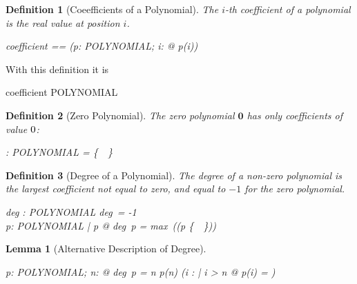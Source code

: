 \documentclass[12pt]{scrartcl}
\newtheorem{lemma}{Lemma}[section]
\newtheorem{zdef}{Definition}[section]
\begin{document}
\begin{zdef}[Coeefficients of a Polynomial]
  \label{zdef:coefficient}
  The $i$-th coefficient of a polynomial is the real value at position
  $i$. 
  \begin{zed}
    coefficient == (\lambda p: POLYNOMIAL; i: \nat @ p(i))
  \end{zed}
\end{zdef}
%
With this definition it is
\begin{zed}
  coefficient \in POLYNOMIAL \cross \nat \fun \arithmos
\end{zed}
%
\newcommand{\zeropol}{\mathbf{0}}
\begin{zdef}[Zero Polynomial]
  \label{zdef:zero-polynomial}
  The \emph{zero polynomial} $\zeropol$ has only coefficients of value
  $0$:
  \begin{axdef}
    \zeropol : POLYNOMIAL
    \where
    \ran \zeropol = \{~\azero~\}
  \end{axdef}
\end{zdef}

\begin{zdef}[Degree of a Polynomial]
  The degree of a non-zero polynomial is the largest coefficient not equal to
  zero, and equal to $-1$ for the zero polynomial.
  \label{zdef:degree}
  \begin{axdef}
    deg : POLYNOMIAL \fun \nat
    \where
    deg~\zeropol = -1 \\
    \forall p: POLYNOMIAL | p \neq \zeropol @ deg~p = max~(\dom (p \nrres
  \{~\azero~\}))\\
  \end{axdef}
\end{zdef}

\begin{lemma}[Alternative Description of Degree]
  \label{lemma:alternative-degree}
  \begin{zed}
    \forall p: POLYNOMIAL; n: \nat @ deg~p = n \iff p(n) \neq \azero \land
    (\forall i : \nat | i > n @ p(i) = \azero)
  \end{zed}
\end{lemma}
\end{document}
